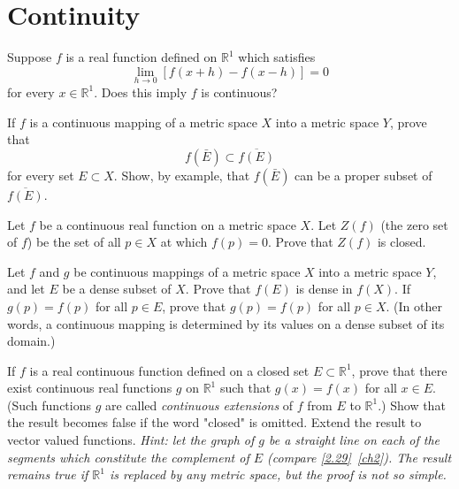 \chapter{Continuity}

\begin{exercise}
\item
  Suppose \(f\) is a real function defined on \(\mathbb{R}^1\) which satisfies
  \[
  \lim_{h\to 0}[f(x + h) - f(x - h)] = 0
  \]
  for every \(x\in\mathbb{R}^1\).
  Does this imply \(f\) is continuous?
\item
  If \(f\) is a continuous mapping of a metric space \(X\) into a metric space
  \(Y\), prove that
  \[
  f(\bar{E})\subset\overline{f(E)}
  \]
  for every set \(E\subset X\).
  Show, by example, that \(f(\bar{E})\) can be a proper subset of
  \(\overline{f(E)}\).
\item
  Let \(f\) be a continuous real function on a metric space \(X\).
  Let \(Z(f)\) (the zero set of \(f\)) be the set of all \(p\in X\) at which
  \(f(p) = 0\).
  Prove that \(Z(f)\) is closed.
\item
  Let \(f\) and \(g\) be continuous mappings of a metric space \(X\) into a
  metric space \(Y\), and let \(E\) be a dense subset of \(X\).
  Prove that \(f(E)\) is dense in \(f(X)\).
  If \(g(p) = f(p)\) for all \(p\in E\), prove that \(g(p) = f(p)\) for all
  \(p\in X\).
  (In other words, a continuous mapping is determined by its values on a dense
  subset of its domain.)
\item
  If \(f\) is a real continuous function defined on a closed set
  \(E\subset\mathbb{R}^1\), prove that there exist continuous real functions
  \(g\) on \(\mathbb{R}^1\) such that \(g(x) = f(x)\) for all \(x\in E\).
  (Such functions \(g\) are called \textit{continuous extensions} of \(f\) from
  \(E\) to \(\mathbb{R}^1\).)
  Show that the result becomes false if the word "closed" is omitted.
  Extend the result to vector valued functions.
  \textit{Hint: let the graph of \(g\) be a straight line on each of the
    segments which constitute the complement of \(E\) (compare
    \cref{2.29}~\cref{ch2}).
    The result remains true if \(\mathbb{R}^1\) is replaced by any metric
    space, but the proof is not so simple.}
\end{exercise}

